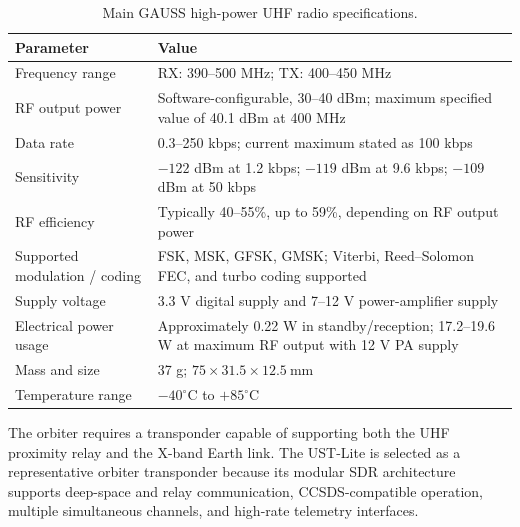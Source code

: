 \begin{table}[H]
\centering
\caption{Main GAUSS high-power UHF radio specifications.}
\label{tab:gauss_uhf_radio_specs}
\scriptsize
\renewcommand{\arraystretch}{1.10}
\setlength{\tabcolsep}{3pt}
\begin{tabular}{|p{3.5cm}|p{9.0cm}|}
\hline
\textbf{Parameter} & \textbf{Value} \\
\hline
Frequency range & RX: 390--500 MHz; TX: 400--450 MHz \\
\hline
RF output power & Software-configurable, 30--40 dBm; maximum specified value of 40.1 dBm at 400 MHz \\
\hline
Data rate & 0.3--250 kbps; current maximum stated as 100 kbps \\
\hline
Sensitivity & \(-122\) dBm at 1.2 kbps; \(-119\) dBm at 9.6 kbps; \(-109\) dBm at 50 kbps \\
\hline
RF efficiency & Typically 40--55\%, up to 59\%, depending on RF output power \\
\hline
Supported modulation / coding & FSK, MSK, GFSK, GMSK; Viterbi, Reed--Solomon FEC, and turbo coding supported \\
\hline
Supply voltage & 3.3 V digital supply and 7--12 V power-amplifier supply \\
\hline
Electrical power usage & Approximately 0.22 W in standby/reception; 17.2--19.6 W at maximum RF output with 12 V PA supply \\
\hline
Mass and size & 37 g; \(75 \times 31.5 \times 12.5~\mathrm{mm}\) \\
\hline
Temperature range & \(-40^\circ\mathrm{C}\) to \(+85^\circ\mathrm{C}\) \\
\hline
\end{tabular}
\end{table}

The orbiter requires a transponder capable of supporting both the UHF proximity relay and the X-band Earth link. The UST-Lite is selected as a representative orbiter transponder because its modular SDR architecture supports deep-space and relay communication, CCSDS-compatible operation, multiple simultaneous channels, and high-rate telemetry interfaces.

